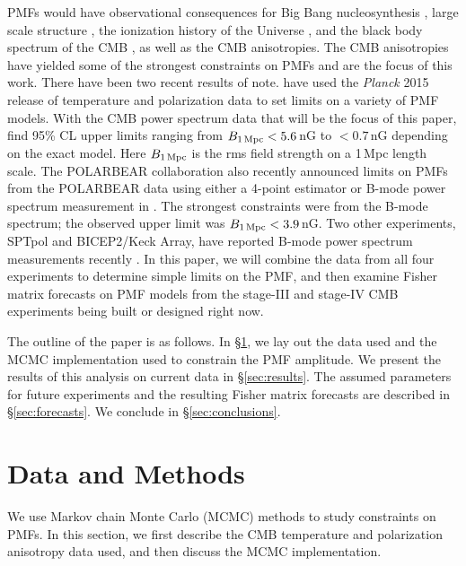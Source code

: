 \documentclass[apj]{emulateapj}
\newcommand{\bpmf}{\ensuremath{B_{\rm 1\,Mpc}}}
\newcommand{\planck}{{\sl Planck}}
\newcommand{\bicepkeck}{BICEP2/Keck Array}
\newcommand{\pb}{POLARBEAR}
\newcommand{\sptpol}{SPTpol}
\begin{document}
PMFs would have observational consequences for Big Bang nucleosynthesis \citep[e.g.,][]{kahniashvili10}, large scale structure \citep[e.g.,][]{battaner97}, the ionization history of the Universe \citep{kunze15}, and the black body spectrum of the CMB \citep[e.g.,][]{kunze14},  as well as the CMB anisotropies. 
The CMB anisotropies have yielded some of the strongest constraints on PMFs and are the focus of this work.
There have been two recent results of note. 
\citet{planck15-19} have used the \planck{} 2015 release of temperature and polarization data to set limits on a variety of PMF models. 
With the CMB power spectrum data that will be the focus of this paper, \citet{planck15-19} find 95\% CL upper limits ranging from $\bpmf < 5.6$\,nG to $<0.7$\,nG depending on the exact model. 
Here \bpmf{} is the rms field strength on a 1\,Mpc length scale. 
The \pb{} collaboration also recently announced limits on PMFs from the \pb{} data using either a 4-point estimator or B-mode power spectrum measurement in \citep{polarbear14b}. 
The strongest constraints were from the B-mode spectrum; the observed upper limit was $\bpmf < 3.9$\,nG. 
Two other experiments, \sptpol{} and \bicepkeck{}, have reported B-mode power spectrum measurements recently \citep{keisler15,bicepkeck15}.
In this paper, we will combine the data from all four experiments to determine simple limits on the PMF, and then examine Fisher matrix forecasts on PMF models from the stage-III and stage-IV CMB experiments being built or designed right now. 



The outline of the paper is as follows. 
In \S\ref{sec:data}, we lay out the data used and the MCMC implementation used to constrain the PMF amplitude. 
We present the results of this analysis on current data in \S\ref{sec:results}. 
The assumed parameters for future experiments and the resulting Fisher matrix forecasts are described in \S\ref{sec:forecasts}. 
We conclude in \S\ref{sec:conclusions}. 

\section{Data and Methods}
\label{sec:data}

We use  Markov chain Monte Carlo (MCMC) methods to study constraints on PMFs. 
In this section, we first describe the CMB temperature and polarization anisotropy data used, and then discuss the MCMC implementation. 
\end{document}

